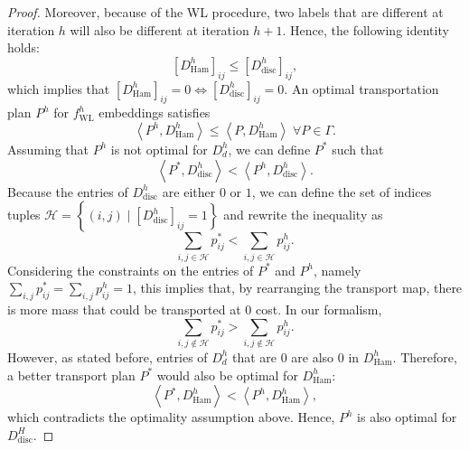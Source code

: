 \documentclass{article}
\begin{document}
\begin{proof}
Moreover, because of the WL procedure, two labels that are different at iteration $h$ will also be different at iteration $h+1$. Hence, the following identity holds:
$$
\left [D_{\mathrm{Ham}}^h \right ]_{ij} \leq
\left [D_{\mathrm{disc}}^{h} \right ]_{ij},
$$
which implies that $[D_{\mathrm{Ham}}^h]_{ij} =0 \iff [D_{\mathrm{disc}}^h]_{ij} =0$. 
An optimal transportation plan $P^{h}$ for $f^{h}_{\mathrm{\scriptscriptstyle{WL}}}$ embeddings satisfies
$$
\left \langle P^{h}, D_{\mathrm{Ham}}^{h}\right \rangle \leq \left \langle P, D_{\mathrm{Ham}}^{h}\right \rangle \; \forall P \in \Gamma.
$$
Assuming that $P^h$ is not optimal for $D_d^h$, we can define $P^*$ such that
$$
\left \langle P^{*}, D_{\mathrm{disc}}^{h}\right \rangle < \left \langle P^h, D_{\mathrm{disc}}^{h}\right \rangle.
$$
Because the entries of $D_{\mathrm{disc}}^h$ are either $0$ or $1$, we can define the set of indices tuples $\mathcal{H} = \left \{(i,j) \; | \; [D_{\mathrm{disc}}^h]_{ij} =1 \right \}$ and rewrite the inequality as
$$
\sum_{i,j \in \mathcal{H}} p^*_{ij} < \sum_{i,j \in \mathcal{H}} p^h_{ij}.
$$
Considering the constraints on the entries of $P^*$ and $P^h$, namely $\sum_{i,j} p^*_{ij} = \sum_{i,j} p^h_{ij} = 1$, this implies that, by rearranging the transport map, there is more mass that could be transported at $0$ cost. In our formalism,
$$
\sum_{i,j \notin \mathcal{H}} p^*_{ij} > \sum_{i,j \notin \mathcal{H}} p^h_{ij}.
$$
However, as stated before, entries of $D_d^h$ that are $0$ are also $0$ in $D_\mathrm{Ham}^h$. Therefore, a better transport plan $P^*$ would also be optimal for $D_\mathrm{Ham}^h$:
$$
\left \langle P^{*}, D_{\mathrm{Ham}}^{h}\right \rangle < \left \langle P^h, D_{\mathrm{Ham}}^{h}\right \rangle,
$$
which contradicts the optimality assumption above. Hence, $P^h$ is also optimal for $D_\mathrm{disc}^H$.

\end{proof}
\end{document}
